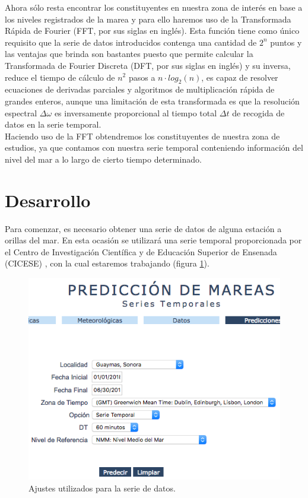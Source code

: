 \documentclass[12pt]{article}
\begin{document}
\noindent Ahora sólo resta encontrar los constituyentes en nuestra zona de interés en base a los niveles registrados de la marea y para ello haremos uso de la Transformada Rápida de Fourier (FFT, por sus siglas en inglés). Esta función tiene como único requisito que la serie de datos introducidos contenga una cantidad de $2^{n}$ puntos y las ventajas que brinda son bastantes puesto que permite calcular la Transformada de Fourier Discreta (DFT, por sus siglas en inglés) y su inversa, reduce el tiempo de cálculo de $n^{2}$ pasos a $n\cdot log_{2}(n)$, es capaz de resolver ecuaciones de derivadas parciales y algoritmos de multiplicación rápida de grandes enteros, aunque una limitación de esta transformada es que la resolución espectral $\Delta \omega$ es inversamente proporcional al tiempo total $\Delta t$ de recogida de datos en la serie temporal. \\
\indent Haciendo uso de la FFT obtendremos los constituyentes de nuestra zona de estudios, ya que contamos con nuestra serie temporal conteniendo información del nivel del mar a lo largo de cierto tiempo determinado.

\section{Desarrollo}

\noindent Para comenzar, es necesario obtener una serie de datos de alguna estación a orillas del mar. En esta ocasión se utilizará una serie temporal proporcionada por el Centro de Investigación Científica y de Educación Superior de Ensenada (CICESE) \cite{CICESE}, con la cual estaremos trabajando (figura \ref{fig:config}).

\begin{figure}[h!]
	\center
	\includegraphics[scale=.67]{./Images/config}
	\caption{\label{fig:config} Ajustes utilizados para la serie de datos.}
\end{figure}
\end{document}
